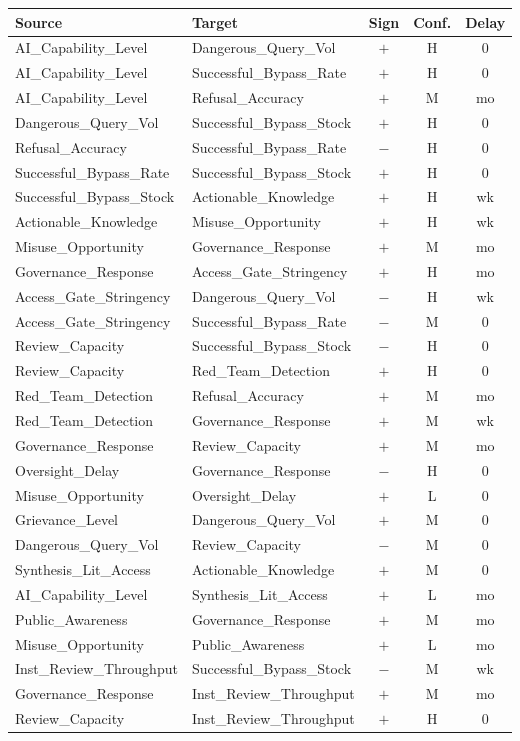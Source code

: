 \documentclass[11pt]{article}
\begin{document}
\begin{longtable}{@{}p{4.5cm}p{4.5cm}ccc@{}}
\toprule
\textbf{Source} & \textbf{Target} & \textbf{Sign} & \textbf{Conf.} & \textbf{Delay} \\
\midrule
\endhead
AI\_Capability\_Level & Dangerous\_Query\_Vol & $+$ & H & 0 \\
AI\_Capability\_Level & Successful\_Bypass\_Rate & $+$ & H & 0 \\
AI\_Capability\_Level & Refusal\_Accuracy & $+$ & M & mo \\
Dangerous\_Query\_Vol & Successful\_Bypass\_Stock & $+$ & H & 0 \\
Refusal\_Accuracy & Successful\_Bypass\_Rate & $-$ & H & 0 \\
Successful\_Bypass\_Rate & Successful\_Bypass\_Stock & $+$ & H & 0 \\
Successful\_Bypass\_Stock & Actionable\_Knowledge & $+$ & H & wk \\
Actionable\_Knowledge & Misuse\_Opportunity & $+$ & H & wk \\
Misuse\_Opportunity & Governance\_Response & $+$ & M & mo \\
Governance\_Response & Access\_Gate\_Stringency & $+$ & H & mo \\
Access\_Gate\_Stringency & Dangerous\_Query\_Vol & $-$ & H & wk \\
Access\_Gate\_Stringency & Successful\_Bypass\_Rate & $-$ & M & 0 \\
Review\_Capacity & Successful\_Bypass\_Stock & $-$ & H & 0 \\
Review\_Capacity & Red\_Team\_Detection & $+$ & H & 0 \\
Red\_Team\_Detection & Refusal\_Accuracy & $+$ & M & mo \\
Red\_Team\_Detection & Governance\_Response & $+$ & M & wk \\
Governance\_Response & Review\_Capacity & $+$ & M & mo \\
Oversight\_Delay & Governance\_Response & $-$ & H & 0 \\
Misuse\_Opportunity & Oversight\_Delay & $+$ & L & 0 \\
Grievance\_Level & Dangerous\_Query\_Vol & $+$ & M & 0 \\
Dangerous\_Query\_Vol & Review\_Capacity & $-$ & M & 0 \\
Synthesis\_Lit\_Access & Actionable\_Knowledge & $+$ & M & 0 \\
AI\_Capability\_Level & Synthesis\_Lit\_Access & $+$ & L & mo \\
Public\_Awareness & Governance\_Response & $+$ & M & mo \\
Misuse\_Opportunity & Public\_Awareness & $+$ & L & mo \\
Inst\_Review\_Throughput & Successful\_Bypass\_Stock & $-$ & M & wk \\
Governance\_Response & Inst\_Review\_Throughput & $+$ & M & mo \\
Review\_Capacity & Inst\_Review\_Throughput & $+$ & H & 0 \\
\bottomrule
\end{longtable}
\end{document}
